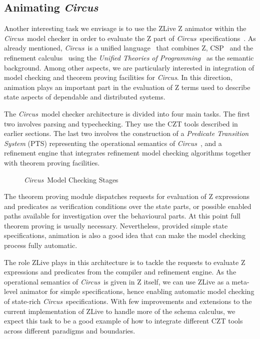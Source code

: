 \documentclass{llncs}
\newcommand{\Circus}{{\sf\slshape Circus}}
\begin{document}
\subsection{Animating \Circus}

    Another interesting task we envisage is to use the ZLive Z animator within the \Circus\ model checker
    in order to evaluate the Z part of \Circus\ specifications~\cite{circus.mc:leo}.
    As already mentioned, \Circus\ is a unified language~\cite{circus.sem:intro} that combines Z,
    CSP~\cite{csp.books:roscoe} and the refinement calculus~\cite{fm.ref:morgan}
    using the \textit{Unified Theories of Programming}~\cite{hoare.utp} as the semantic background.
    Among other aspects, we are particularly interested in integration of model checking and
    theorem proving facilities for \Circus. In this direction, animation plays an important part
    in the evaluation of Z terms used to describe state aspects of dependable and distributed systems.

    The \Circus\ model checker architecture is divided into four main tasks. The first
    two involves parsing and typechecking. They use the CZT tools described in earlier
    sections. The last two involves the construction of a \textit{Predicate Transition System}
    (PTS) representing the operational semantics of \Circus~\cite{circus.mc:opsem},
    and a refinement engine that integrates refinement model checking algorithms together
    with theorem proving facilities.
    \begin{figure}[t]
    \begin{center}
    \end{center}    \caption{\Circus\ Model Checking Stages}\label{mc-stages}
    \end{figure}
    The theorem proving module dispatches requests for evaluation of Z expressions and predicates
    as verification conditions over the state parts, or possible enabled paths available for
    investigation over the behavioural parts.
    At this point full theorem proving is usually necessary. Nevertheless, provided simple state
    specifications, animation is also a good idea that can make the model checking process fully
    automatic.

    The role ZLive plays in this architecture is to tackle the requests to evaluate
    Z expressions and predicates from the compiler and refinement engine.
    As the operational semantics of \Circus\ is given in Z itself, we can use ZLive as a
    meta-level animator for simple specifications, hence enabling automatic model checking
    of state-rich \Circus\ specifications.
    With few improvements and extensions to the current implementation of ZLive to handle
    more of the schema calculus, we expect this task to be a good example of how to integrate
    different CZT tools across different paradigms and boundaries.
\end{document}
